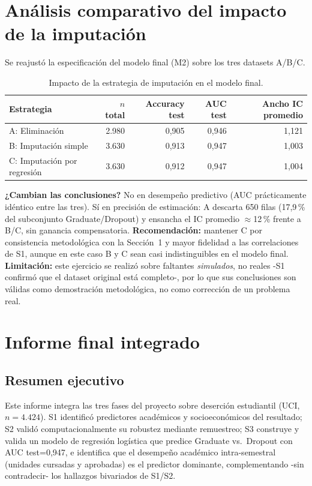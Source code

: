 \documentclass[11pt,a4paper]{article}
\begin{document}
\section{Análisis comparativo del impacto de la imputación}

Se reajustó la especificación del modelo final (M2) sobre los tres datasets A/B/C.

\begin{table}[h]
\centering
\small
\begin{tabular}{@{}lrrrr@{}}
\toprule
Estrategia & $n$ total & Accuracy test & AUC test & Ancho IC promedio \\
\midrule
A: Eliminación & 2.980 & 0{,}905 & 0{,}946 & 1{,}121 \\
B: Imputación simple & 3.630 & 0{,}913 & 0{,}947 & 1{,}003 \\
C: Imputación por regresión & 3.630 & 0{,}912 & 0{,}947 & 1{,}004 \\
\bottomrule
\end{tabular}
\caption{Impacto de la estrategia de imputación en el modelo final.}
\label{tab:impacto_imputacion}
\end{table}

\textbf{¿Cambian las conclusiones?} No en desempeño predictivo (AUC prácticamente idéntico entre
las tres). Sí en precisión de estimación: A descarta 650 filas (17{,}9\,\% del subconjunto
Graduate/Dropout) y ensancha el IC promedio $\approx$12\,\% frente a B/C, sin ganancia
compensatoria. \textbf{Recomendación:} mantener C por consistencia metodológica con la
Sección~1 y mayor fidelidad a las correlaciones de S1, aunque en este caso B y C sean casi
indistinguibles en el modelo final. \textbf{Limitación:} este ejercicio se realizó sobre faltantes
\emph{simulados}, no reales -S1 confirmó que el dataset original está completo-, por lo que sus
conclusiones son válidas como demostración metodológica, no como corrección de un problema real.

\section{Informe final integrado}

\subsection{Resumen ejecutivo}

Este informe integra las tres fases del proyecto sobre deserción estudiantil (UCI, $n=4.424$). S1
identificó predictores académicos y socioeconómicos del resultado; S2 validó computacionalmente su
robustez mediante remuestreo; S3 construye y valida un modelo de regresión logística que predice
Graduate vs.\ Dropout con AUC test=0{,}947, e identifica que el desempeño académico intra-semestral
(unidades cursadas y aprobadas) es el predictor dominante, complementando -sin contradecir- los
hallazgos bivariados de S1/S2.
\end{document}

